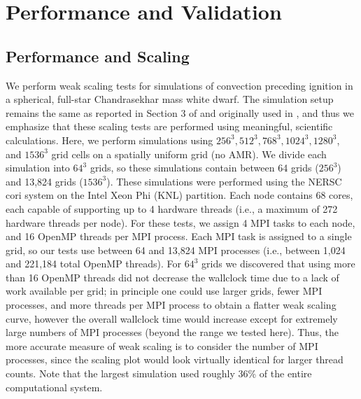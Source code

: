 \section{Performance and Validation}\label{sec:results}

\subsection{Performance and Scaling}\label{sec:scaling}
We perform weak scaling tests for simulations of convection preceding ignition in a spherical, full-star Chandrasekhar mass white dwarf. 
The simulation setup remains the same as reported in Section 3 of \cite{MAESTRO_AMR} and originally used in \cite{MAESTRO_convection}, and thus we emphasize that these scaling tests are performed using meaningful, scientific calculations.
Here, we perform simulations using $256^3, 512^3, 768^3, 1024^3, 1280^3$, and $1536^3$ grid cells on a spatially uniform grid (no AMR).
We divide each simulation into $64^3$ grids, so these simulations contain between 64 grids ($256^3$) and 13,824 grids ($1536^3$).
These simulations were performed using the NERSC cori system on the Intel Xeon Phi (KNL) partition.
Each node contains 68 cores, each capable of supporting up to 4 hardware threads (i.e., a maximum of 272 hardware threads per node).
For these tests, we assign 4 MPI tasks to each node, and 16 OpenMP threads per MPI process.
Each MPI task is assigned to a single grid, so our tests use between 64 and 13,824 MPI processes (i.e., between 1,024 and 221,184 total OpenMP threads).
For $64^3$ grids we discovered that using more than 16 OpenMP threads did not decrease the wallclock time due to a lack of work available per grid; in principle one could use larger grids, fewer MPI processes, and more threads per MPI process to obtain a flatter weak scaling curve, however the overall wallclock time would increase except for extremely large numbers of MPI processes (beyond the range we tested here).
Thus, the more accurate measure of weak scaling is to consider the number of MPI processes, since the scaling plot would look virtually identical for larger thread counts.
Note that the largest simulation used roughly 36\% of the entire computational system.
